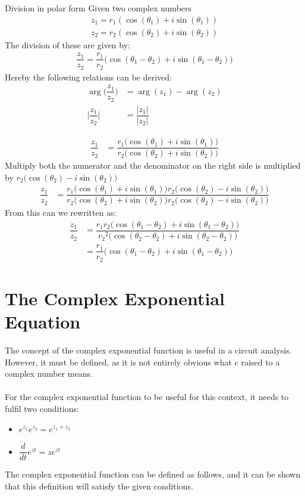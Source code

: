 \begin{theorem}{Division in polar form}{}
Given two complex numbers
\begin{align*}
z_1=r_1(\cos(\theta_1)+i\sin(\theta_1)) 
\\
z_2=r_2(\cos(\theta_2)+i\sin(\theta_2))
\end{align*}
The division of these are given by:
\begin{align*}
\dfrac{z_1}{z_2}=\dfrac{r_1}{r_2}\Big( \cos(\theta_1-\theta_2)+ i \sin(\theta_1-\theta_2)\Big)
\end{align*}
Hereby the following relations can be derived:
\begin{align}
\arg\Big(\dfrac{z_1}{z_2}\Big)&=\arg(z_1)-\arg(z_2)
\\
\Big|\dfrac{z_1}{z_2}\Big|&=\dfrac{|z_1|}{|z_2|} \label{eq:mod_div}
\end{align}
\end{theorem}
\begin{prof}{}{}
\begin{align}
\dfrac{z_1}{z_2}&=\dfrac{r_1\bigg(\cos(\theta_1)+i\sin(\theta_1)\bigg)}{r_2\bigg(\cos(\theta_2)+i\sin(\theta_2)\bigg)}
\end{align}
Multiply both the numerator and the denominator on the right side is multiplied by $r_2\bigg(\cos(\theta_2)-i\sin(\theta_2)\bigg)$
\begin{align}
\dfrac{z_1}{z_2}&=\dfrac{r_1\bigg(\cos(\theta_1)+i\sin(\theta_1)\bigg)r_2\bigg(\cos(\theta_2)-i\sin(\theta_2)\bigg)}{r_2\bigg(\cos(\theta_2)+i\sin(\theta_2)\bigg)r_2\bigg(\cos(\theta_2)-i\sin(\theta_2)\bigg)}
\end{align}
From  this can we rewritten as:
\begin{align}
\dfrac{z_1}{z_2}&=\dfrac{r_1r_2\bigg(\cos(\theta_1-\theta_2)+i\sin(\theta_1-\theta_2)\bigg)}{{r_2}^2\bigg(\cos(\theta_2-\theta_2)+i\sin(\theta_2-\theta_2)\bigg)}
\\
&=\dfrac{r_1}{r_2}\Big( \cos(\theta_1-\theta_2)+ i \sin(\theta_1-\theta_2)\Big)
\end{align}
\end{prof}
\section{The Complex Exponential Equation}
The concept of the complex exponential function is useful in a circuit analysis. However, it must be defined, as it is not entirely obvious what $e$ raised to a complex number means.
\\
\\
For the complex exponential function to be useful for this context, it needs to fulfil two conditions:
\begin{itemize}
	\item $e^{z_1}e^{z_2} = e^{z_1 + z_2}$
	\item $\dfrac{d}{dt}e^{zt} = ze^{zt}$
\end{itemize}
The complex exponential function can be defined as follows, and it can be shown that this definition will satisfy the given conditions.

